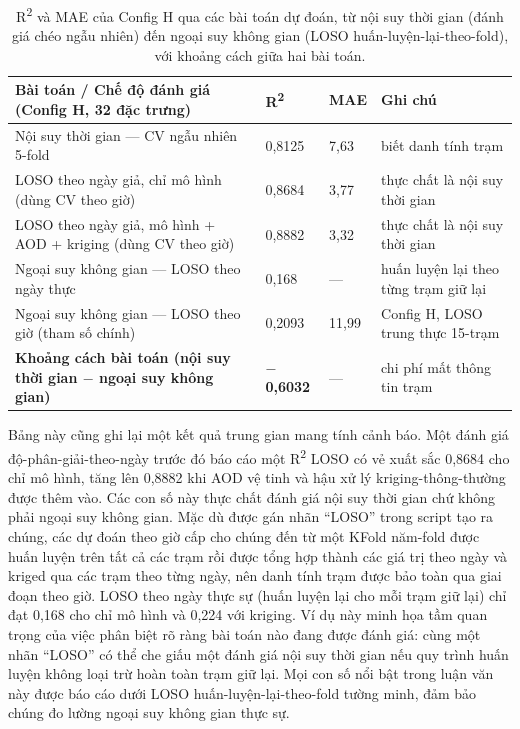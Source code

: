 {\small
\begin{longtable}{llll}
\caption{R\textsuperscript{2} và MAE của Config H qua các bài toán dự đoán, từ nội suy thời gian (đánh giá chéo ngẫu nhiên) đến ngoại suy không gian (LOSO huấn-luyện-lại-theo-fold), với khoảng cách giữa hai bài toán.}\\
\toprule
\textbf{Bài toán / Chế độ đánh giá (Config H, 32 đặc trưng)} & \textbf{R\textsuperscript{2}} & \textbf{MAE} & \textbf{Ghi chú} \\
\midrule\endhead
Nội suy thời gian --- CV ngẫu nhiên 5-fold & 0,8125 & 7,63 & biết danh tính trạm \\
LOSO theo ngày giả, chỉ mô hình (dùng CV theo giờ) & 0,8684 & 3,77 & thực chất là nội suy thời gian \\
LOSO theo ngày giả, mô hình + AOD + kriging (dùng CV theo giờ) & 0,8882 & 3,32 & thực chất là nội suy thời gian \\
Ngoại suy không gian --- LOSO theo ngày thực & 0,168 & --- & huấn luyện lại theo từng trạm giữ lại \\
Ngoại suy không gian --- LOSO theo giờ (tham số chính) & 0,2093 & 11,99 & Config H, LOSO trung thực 15-trạm \\
\textbf{Khoảng cách bài toán (nội suy thời gian $-$ ngoại suy không gian)} & \textbf{$-$0,6032} & --- & chi phí mất thông tin trạm \\
\bottomrule
\end{longtable}
}


Bảng này cũng ghi lại một kết quả trung gian mang tính cảnh báo. Một đánh giá độ-phân-giải-theo-ngày trước đó báo cáo một R\textsuperscript{2} LOSO có vẻ xuất sắc 0,8684 cho chỉ mô hình, tăng lên 0,8882 khi AOD vệ tinh và hậu xử lý kriging-thông-thường được thêm vào. Các con số này thực chất đánh giá nội suy thời gian chứ không phải ngoại suy không gian. Mặc dù được gán nhãn ``LOSO'' trong script tạo ra chúng, các dự đoán theo giờ cấp cho chúng đến từ một KFold năm-fold được huấn luyện trên tất cả các trạm rồi được tổng hợp thành các giá trị theo ngày và kriged qua các trạm theo từng ngày, nên danh tính trạm được bảo toàn qua giai đoạn theo giờ. LOSO theo ngày thực sự (huấn luyện lại cho mỗi trạm giữ lại) chỉ đạt 0,168 cho chỉ mô hình và 0,224 với kriging. Ví dụ này minh họa tầm quan trọng của việc phân biệt rõ ràng bài toán nào đang được đánh giá: cùng một nhãn ``LOSO'' có thể che giấu một đánh giá nội suy thời gian nếu quy trình huấn luyện không loại trừ hoàn toàn trạm giữ lại. Mọi con số nổi bật trong luận văn này được báo cáo dưới LOSO huấn-luyện-lại-theo-fold tường minh, đảm bảo chúng đo lường ngoại suy không gian thực sự.

